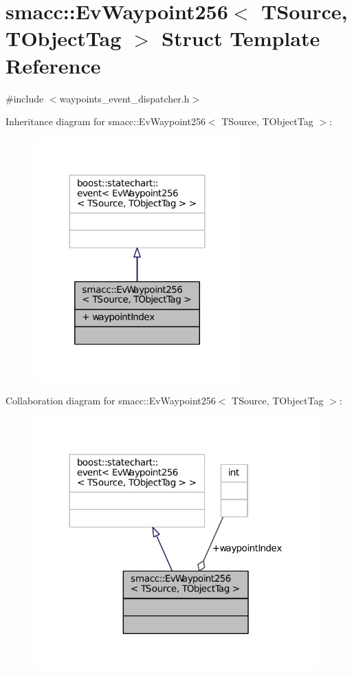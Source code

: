 \hypertarget{structsmacc_1_1EvWaypoint256}{}\section{smacc\+:\+:Ev\+Waypoint256$<$ T\+Source, T\+Object\+Tag $>$ Struct Template Reference}
\label{structsmacc_1_1EvWaypoint256}


{\ttfamily \#include $<$waypoints\+\_\+event\+\_\+dispatcher.\+h$>$}



Inheritance diagram for smacc\+:\+:Ev\+Waypoint256$<$ T\+Source, T\+Object\+Tag $>$\+:
\nopagebreak
\begin{figure}[H]
\begin{center}
\leavevmode
\includegraphics[width=227pt]{structsmacc_1_1EvWaypoint256__inherit__graph}
\end{center}
\end{figure}


Collaboration diagram for smacc\+:\+:Ev\+Waypoint256$<$ T\+Source, T\+Object\+Tag $>$\+:
\nopagebreak
\begin{figure}[H]
\begin{center}
\leavevmode
\includegraphics[width=312pt]{structsmacc_1_1EvWaypoint256__coll__graph}
\end{center}
\end{figure}
